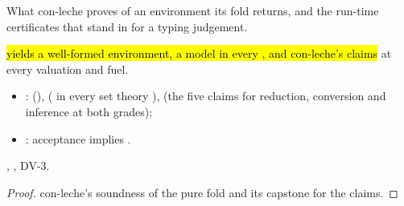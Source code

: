 What con-leche proves of an environment its fold returns, and the run-time certificates that stand in
for a typing judgement.

\begin{lemma}
  \label{lem:EraseProof-ConLecheAccepts-accepted}
  \leanok
   \hl{ yields a well-formed environment, a model in every , and con-leche's claims} at every valuation and fuel.
  \begin{itemize}
  \item {}:  (),  ( in every set theory ),  (the five claims for reduction, conversion and inference at both grades);
  \item {}: acceptance implies .
  \end{itemize}
   , , DV-3.
\end{lemma}
\begin{proof}
  \leanok
   con-leche's soundness of the pure fold and its capstone for the claims.
\end{proof}

